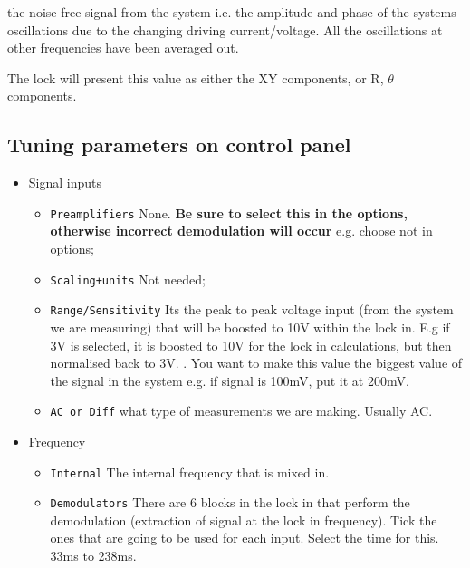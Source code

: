   \noindent the noise free signal  from the system i.e. the amplitude
  and phase of  the systems oscillations due to  the changing driving
  current/voltage.  All the  oscillations at  other frequencies  have
  been averaged out.

  The lock will present this value as either the XY components, or R,
  $ \theta $ components.

  \subsection{Tuning parameters on control panel}
  \begin{itemize}
  \item Signal inputs
    \begin{itemize}
    \item  \texttt{Preamplifiers}  {\ira  None.  \textbf{Be  sure  to
          select   this   in   the   options,   otherwise   incorrect
          demodulation  will  occur}  e.g.  choose    not
         in options;}
    \item \texttt{Scaling+units} {\ira Not needed;}
    \item  \texttt{Range/Sensitivity}  \ira  Its  the  peak  to  peak
      voltage input (from  the system we are measuring)  that will be
      boosted to 10V within the lock in. E.g if 3V is selected, it is
      boosted  to  10V  for  the   lock  in  calculations,  but  then
      normalised back to 3V. .  You want to make this value  the biggest value
      of the signal in the system e.g.  if signal is 100mV, put it at
      200mV.
    \item \texttt{AC or  Diff} \ira what type of  measurements we are
      making. Usually AC.
    \end{itemize}
  \item Frequency
    \begin{itemize}
    \item \texttt{Internal} \ira The internal frequency that is mixed
      in. 
    \item \texttt{Demodulators} \ira  There are 6 blocks  in the lock
      in that perform  the demodulation (extraction of  signal at the
      lock in frequency). Tick the ones that are going to be used for
      each  input.  Select  the  time  for  this.  {33ms  to  238ms.}
\end{itemize}
\end{itemize}
